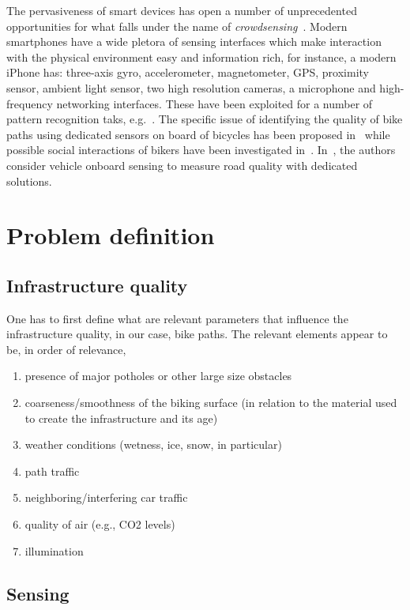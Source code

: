 \documentclass[preprint,12pt]{elsarticle}
\theoremstyle{definition}
\begin{document}
The pervasiveness of smart devices has open a number of unprecedented
opportunities for what falls under the name of {\em
  crowdsensing}~\cite{gan:mob11}. Modern smartphones have a wide
pletora of sensing interfaces which make interaction with the physical
environment easy and information rich, for instance, a modern iPhone
has: three-axis gyro, accelerometer, magnetometer, GPS, proximity
sensor, ambient light sensor, two high resolution cameras, a
microphone and high-frequency networking interfaces. These have been
exploited for a number of pattern recognition taks,
e.g.~\cite{fuj:iph10}. The specific issue of identifying the quality
of bike paths using dedicated sensors on board of bicycles has been
proposed in~\cite{eis:bik07} while possible social interactions of
bikers have been investigated
in~\cite{red:bik10}. In~\cite{eri:pot08}, the authors consider vehicle
onboard sensing to measure road quality with dedicated solutions.



\section{Problem definition}

\subsection{Infrastructure quality}

One has to first define what are relevant parameters that influence
the infrastructure quality, in our case, bike paths. The relevant
elements appear to be, in order of relevance,
\begin{enumerate}
\item presence of major potholes or other large size obstacles
\item coarseness/smoothness of the biking surface (in relation to the
  material used to create the infrastructure and its age)
\item weather conditions (wetness, ice, snow, in particular)
\item path traffic 
\item neighboring/interfering car traffic
\item quality of air (e.g., CO2 levels)
\item illumination
\end{enumerate}


\subsection{Sensing}
\end{document}
